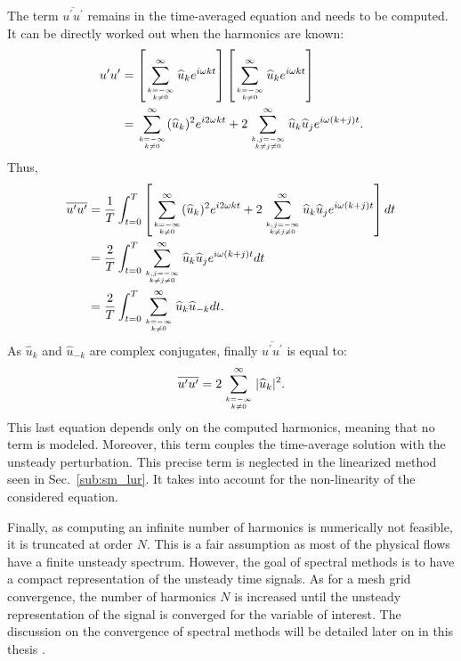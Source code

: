 The term $\overline{u^\prime u^\prime}$ remains in the time-averaged
equation and needs to be computed. It can be 
directly worked out when the harmonics are known:
\begin{equation}
	\begin{split}
		u^\prime u^\prime &= 
		\left[
			\sum_{k=-\infty \atop k \neq 0}^{\infty} \widehat{u}_k e^{i \omega k t} 
		\right]
		\left[
			\sum_{k=-\infty \atop k \neq 0}^{\infty} \widehat{u}_k e^{i \omega k t} 
		\right] \\
		&= \sum_{k=-\infty \atop k \neq 0}^{\infty} (\widehat{u}_k)^2
		   e^{i 2 \omega k t} +
		   2 \sum_{k,j=-\infty \atop k \neq j \neq 0}^{\infty} 
		   \widehat{u}_k \widehat{u}_j e^{i \omega (k + j) t}.
	\end{split}
\end{equation}
Thus,
\begin{equation}
	\begin{split}
		\overline{u^\prime u^\prime} &= 
		\frac{1}{T} \int_{t=0}^{T} \left[ 
			\sum_{k=-\infty \atop k \neq 0}^{\infty} (\widehat{u}_k)^2
		   	e^{i 2 \omega k t} +
		   	2 \sum_{k,j=-\infty \atop k \neq j \neq 0}^{\infty} 
		   	\widehat{u}_k \widehat{u}_j e^{i \omega (k + j) t} 
		\right] dt\\
		&= \frac{2}{T} \int_{t=0}^{T} \sum_{k,j=-\infty \atop k \neq j \neq 0}^{\infty} 
		   	\widehat{u}_k \widehat{u}_j 
		   	e^{i \omega (k + j) t} dt \\
		&= \frac{2}{T} \int_{t=0}^{T} 
			\sum_{k=-\infty \atop k \neq 0}^{\infty} 
			\widehat{u}_k \widehat{u}_{-k}  dt.
	\end{split}
\end{equation}
As $\widehat{u}_k$ and $\widehat{u}_{-k}$ are complex conjugates,
finally $\overline{u^\prime u^\prime}$ is equal to:
\begin{equation}
	\overline{u^\prime u^\prime} = 
	2 \sum_{k=-\infty \atop k \neq 0}^{\infty} |\widehat{u}_k|^2.
	\label{eq:sm_nlh_deterministic_stress_terms}
\end{equation}
This last equation depends only on the computed harmonics, meaning
that no term is modeled. Moreover, this term couples the
time-average solution with the unsteady perturbation. This precise
term is neglected in the linearized method seen in 
Sec.~\ref{sub:sm_lur}. It takes into account for the 
non-linearity of the considered equation.

Finally, as computing an infinite number of harmonics is 
numerically not feasible,
it is truncated at order $N$. 
This is a fair assumption as most
of the physical flows have a finite unsteady spectrum.
However, the goal of spectral
methods is to have a compact representation of the unsteady time
signals. As for a mesh grid convergence, the number of harmonics $N$
is increased until the unsteady representation of the signal is
converged for the variable of interest. The discussion on the
convergence of spectral methods will be detailed later on in this 
thesis .

